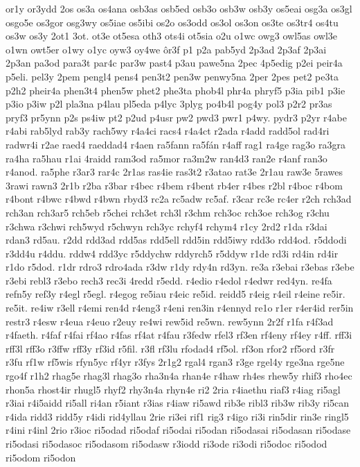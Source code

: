 {or1y
or3ydd
2os
os3a
os4ana
osb3as
osb5ed
osb3o
osb3w
osb3y
os5eai
osg3a
os3gl
osgo5e
os3gor
osg3wy
os5iae
os5ibi
os2o
os3odd
os3ol
os3on
os3te
os3tr4
os4tu
os3w
os3y
2ot1
3ot.
ot3e
ot5esa
oth3
ots4i
ot5sia
o2u
o1wc
owg3
owl5as
owl3e
o1wn
owt5er
o1wy
o1yc
oyw3
oy4we
ôr3f
p1
p2a
pab5yd
2p3ad
2p3af
2p3ai
2p3an
pa3od
para3t
par4c
par3w
past4
p3au
pawe5na
2pec
4p5edig
p2ei
peir4a
p5eli.
pel3y
2pem
pengl4
pens4
pen3t2
pen3w
penwy5na
2per
2pes
pet2
pe3ta
p2h2
pheir4a
phen3t4
phen5w
phet2
phe3ta
phob4l
phr4a
phryf5
p3ia
pib1
p3ie
p3io
p3iw
p2l
pla3na
p4lau
pl5eda
p4lyc
3plyg
po4b4l
pog4y
pol3
p2r2
pr3as
pryf3
pr5ynn
p2s
ps4iw
pt2
p2ud
p4usr
pw2
pwd3
pwr1
p4wy.
pydr3
p2yr
r4abe
r4abi
rab5lyd
rab3y
rach5wy
r4a4ci
racs4
r4a4ct
r2ada
r4add
radd5ol
rad4ri
radwr4i
r2ae
raed4
raeddad4
r4aen
ra5fann
ra5fán
r4aff
rag1
ra4ge
rag3o
ra3gra
ra4ha
ra5hau
r1ai
4raidd
ram3od
ra5mor
ra3m2w
ran4d3
ran2e
r4anf
ran3o
r4anod.
ra5phe
r3ar3
rar4c
2r1as
ras4ie
ras3t2
r3atao
rat3e
2r1au
raw3e
5rawes
3rawi
rawn3
2r1b
r2ba
r3bar
r4bec
r4bem
r4bent
rb4er
r4bes
r2bl
r4boc
r4bom
r4bont
r4bwc
r4bwd
r4bwn
rbyd3
rc2a
rc5adw
rc5af.
r3car
rc3e
rc4er
r2ch
rch3ad
rch3an
rch3ar5
rch5eb
r5chei
rch3et
rch3l
r3chm
rch3oc
rch3oe
rch3og
r3chu
r3chwa
r3chwi
rch5wyd
r5chwyn
rch3yc
rchyf4
rchym4
r1cy
2rd2
r1da
r3dai
rdan3
rd5au.
r2dd
rdd3ad
rdd5as
rdd5ell
rdd5in
rdd5iwy
rdd3o
rdd4od.
r5ddodi
r3dd4u
r4ddu.
rddw4
rdd3yc
r5ddychw
rddyrch5
r5ddyw
r1de
rd3i
rd4in
rd4ir
r1do
r5dod.
r1dr
rdro3
rdro4ada
r3dw
r1dy
rdy4n
rd3yn.
re3a
r3ebai
r3ebas
r3ebe
r3ebi
rebl3
r3ebo
rech3
rec3i
4redd
r5edd.
r4edio
r4edol
r4edwr
red4yn.
re4fa
refn5y
ref3y
r4egl
r5egl.
r4egog
re5iau
r4eic
re5id.
reidd5
r4eig
r4eil
r4eine
re5ir.
re5it.
re4iw
r3ell
r4emi
ren4d
r4eng3
r4eni
ren3in
r4ennyd
re1o
r1er
r4er4id
rer5in
restr3
r4esw
r4eua
r4euo
r2euy
re4wi
rew5id
re5wn.
rew5ynn
2r2f
r1fa
r4f3ad
r4faeth.
r4faf
r4fai
rf4ao
r4fas
rf4at
r4fau
r3fedw
rfel3
rf3en
rf4eny
rf4ey
r4ff.
rff3i
rff3l
rff3o
r3ffw
rff3y
rf3id
r5fil.
r3fl
rf3lu
rfodad4
rf5ol.
rf3on
rfor2
rf5ord
r3fr
r3fu
rf1w
rf5wis
rfyn5yc
rf4yr
r3fys
2r1g2
rgal4
rgan3
r3ge
rgel4y
rge3na
rge5ne
rgo4f
r1h2
rhag5e
rhag3l
rhag3o
rha3n4a
rhan4e
r4haw
rh4es
rhew5y
rhif3
rho4ec
rhon5a
rhost4ir
rhugl5
rhyf2
rhy3n4a
rhyn4e
ri2
2ria
r4iaethu
riaf3
r4iag
ri5agl
r3iai
r4i5aidd
ri5all
ri4an
r5iant
r3ias
r4iaw
ri5awd
rib3e
ribl3
rib3w
rib3y
ri5can
r4ida
ridd3
ridd5y
r4idi
rid4yllau
2rie
ri3ei
rif1
rig3
r4igo
ri3i
rin5dir
rin3e
ringl5
r4ini
r4inl
2rio
r3ioc
ri5odad
ri5odaf
ri5odai
ri5odan
ri5odasai
ri5odasan
ri5odase
ri5odasi
ri5odasoc
ri5odasom
ri5odasw
r3iodd
ri3ode
ri3odi
ri5odoc
ri5odod
ri5odom
ri5odon
}
